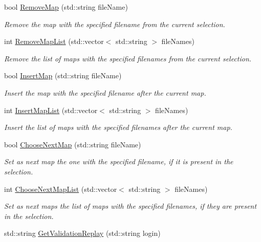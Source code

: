 \begin{DoxyCompactItemize}
bool \hyperlink{classMethods_a1fd515d35dfc0007303ff75c4f50a678}{Remove\-Map} (std\-::string file\-Name)
\begin{DoxyCompactList}\small\item\em Remove the map with the specified filename from the current selection. \end{DoxyCompactList}\item 
int \hyperlink{classMethods_afbac3687bfc17000689598bff14c7610}{Remove\-Map\-List} (std\-::vector$<$ std\-::string $>$ file\-Names)
\begin{DoxyCompactList}\small\item\em Remove the list of maps with the specified filenames from the current selection. \end{DoxyCompactList}\item 
bool \hyperlink{classMethods_a02eb54d04e3ea1970e5312f0aa061d28}{Insert\-Map} (std\-::string file\-Name)
\begin{DoxyCompactList}\small\item\em Insert the map with the specified filename after the current map. \end{DoxyCompactList}\item 
int \hyperlink{classMethods_a1b5d820d4715a10ab6dbb6bed1b28ec4}{Insert\-Map\-List} (std\-::vector$<$ std\-::string $>$ file\-Names)
\begin{DoxyCompactList}\small\item\em Insert the list of maps with the specified filenames after the current map. \end{DoxyCompactList}\item 
bool \hyperlink{classMethods_a8feb1efefe49126cf39089ff6a2f0cd9}{Choose\-Next\-Map} (std\-::string file\-Name)
\begin{DoxyCompactList}\small\item\em Set as next map the one with the specified filename, if it is present in the selection. \end{DoxyCompactList}\item 
int \hyperlink{classMethods_a7db232616b47d7afa1d3202bf156e624}{Choose\-Next\-Map\-List} (std\-::vector$<$ std\-::string $>$ file\-Names)
\begin{DoxyCompactList}\small\item\em Set as next maps the list of maps with the specified filenames, if they are present in the selection. \end{DoxyCompactList}\item 
std\-::string \hyperlink{classMethods_a982673f597077730b8abd3b7ee49853b}{Get\-Validation\-Replay} (std\-::string login)

\end{DoxyCompactItemize}

